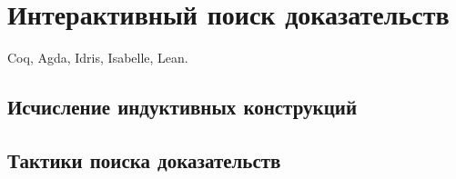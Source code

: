 \chapter{Интерактивный поиск доказательств}

Coq, Agda, Idris, Isabelle, Lean.

\section{Исчисление индуктивных конструкций}

\parencite{coquand1988calculus}

\section{Тактики поиска доказательств}